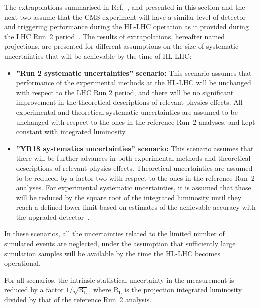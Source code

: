 The extrapolations summarised in Ref.~\cite{CMS-PAS-FTR-18-035},  and presented in this section and the next two assume that the CMS experiment will have a similar level of detector and triggering performance during the HL-LHC operation as it provided during the LHC Run~2
period~\cite{CMSCollaboration:2015zni, Klein:2017nke, Collaboration:2283187, Collaboration:2293646, Collaboration:2283189}.  
The results of extrapolations, hereafter named projections, are presented for different assumptions on the
size of systematic uncertainties that will be achievable by the time of HL-LHC:
\begin{itemize}
\item {\bf ''Run 2 systematic uncertainties'' scenario:} This scenario assumes that performance of the experimental methods at the HL-LHC will be unchanged with respect to the LHC Run 2 period, and there will be no significant improvement in the theoretical descriptions of relevant physics effects. All experimental and
theoretical systematic uncertainties are assumed to be unchanged with respect to the ones in
the reference Run~2 analyses, and kept constant with integrated luminosity.
\item {\bf ''YR18 systematics uncertainties'' scenario:} This scenario assumes that there will be further
advances in both experimental methods and theoretical descriptions of relevant physics effects.
Theoretical uncertainties are assumed to be reduced by a factor two with respect to the ones in the reference
Run~2 analyses. For experimental systematic uncertainties, it is assumed that those will be reduced by the square root
of the integrated luminosity until they reach a defined lower limit based on estimates of
the achievable accuracy with the upgraded detector~\cite{CMS:FTR-18-012}.
\end{itemize}

In these scenarios, all the uncertainties related to the limited number of simulated events are neglected,
 under the assumption that sufficiently large simulation samples will be available by the time the HL-LHC becomes operational.

For all scenarios, the intrinsic statistical uncertainty in the measurement is reduced by a
factor $1/\sqrt{\text{R}_\text{L}}$, where $\text{R}_\text{L}$ is the projection integrated luminosity divided by that of the
reference Run~2 analysis.

